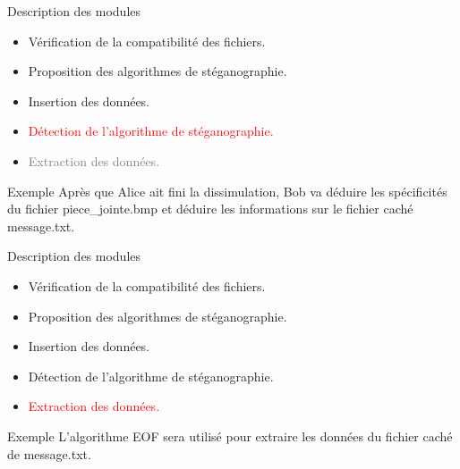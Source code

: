 \documentclass{beamer}
\begin{document}
  \begin{frame} %
	\begin{block}{Description des modules}
	\begin{itemize}
	[circle]
	\item Vérification de la compatibilité des fichiers.
	\item Proposition des algorithmes de stéganographie.
	\item Insertion des données.
	\item \textcolor{red} {Détection de l'algorithme de stéganographie.}
	\item \textcolor{gray} {Extraction des données.}
	\end{itemize}
	\end{block}
	
		\begin{exampleblock}{Exemple} 
	Après que Alice ait fini la dissimulation, Bob va déduire les spécificités
	du fichier piece\_jointe.bmp et déduire les informations sur le fichier 
	caché message.txt. 
	\end{exampleblock}
  \end{frame}
  
  \begin{frame} %
	\begin{block}{Description des modules}
	\begin{itemize}
	[circle]
	\item Vérification de la compatibilité des fichiers.
	\item Proposition des algorithmes de stéganographie.
	\item Insertion des données.
	\item Détection de l'algorithme de stéganographie.
	\item \textcolor{red}{Extraction des données.}
	\end{itemize}
	\end{block}
	
	\begin{exampleblock}{Exemple} 
	L'algorithme EOF sera utilisé pour extraire les  données du fichier 
	caché de message.txt. 
	\end{exampleblock}
  \end{frame}
  
\end{document}
